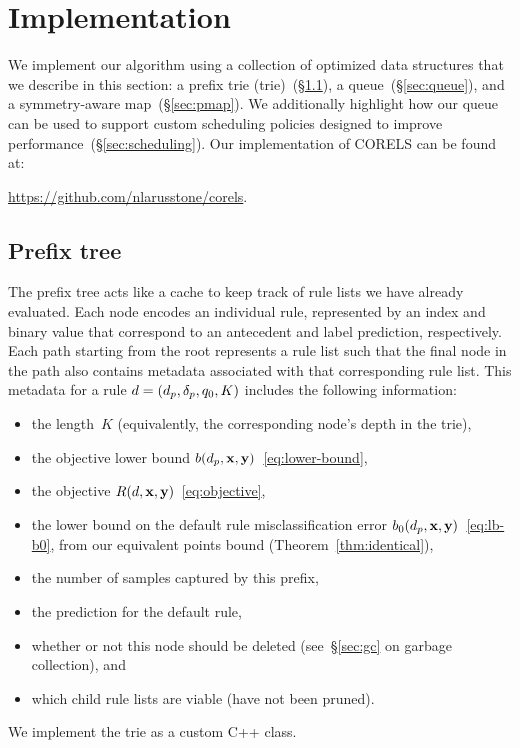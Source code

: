 

\section{Implementation}
\label{sec:implementation}

We implement our algorithm using a collection of optimized data structures
that we describe in this section:
a prefix trie (trie)~(\S\ref{sec:trie}), a queue~(\S\ref{sec:queue}),
and a symmetry-aware map~(\S\ref{sec:pmap}).
%
We additionally highlight how our queue can be used to support
custom scheduling policies designed to improve performance~(\S\ref{sec:scheduling}).
%
Our implementation of CORELS can be found at: \\

\centerline{\url{https://github.com/nlarusstone/corels}.}

\subsection{Prefix tree}
\label{sec:trie}

The prefix tree acts like a cache to keep track of rule lists we have already evaluated.
%
Each node encodes an individual rule, represented by an index and binary value
that correspond to an antecedent and label prediction, respectively.
%
Each path starting from the root represents a rule list such that the final node
in the path also contains metadata associated with that corresponding rule list.
%
This metadata for a rule ${{d} = (d_p, \delta_p, q_0, K)}$
includes the following information:
\begin{itemize}
\item the length~$K$ (equivalently, the corresponding node's depth in the trie),
\item the objective lower bound $b(d_p, \mathbf{x}, \mathbf{y})$~\eqref{eq:lower-bound},
\item the objective $R({d}, \mathbf{x}, \mathbf{y})$~\eqref{eq:objective},
\item the lower bound on the default rule misclassification error
$b_0(d_p, \mathbf{x}, \mathbf{y})$~\eqref{eq:lb-b0},
from our equivalent points bound (Theorem~\ref{thm:identical}),
\item the number of samples captured by this prefix,
\item the prediction for the default rule,
\item whether or not this node should be deleted (see~\S\ref{sec:gc} on garbage collection), and
\item which child rule lists are viable (\ie have not been pruned).
\end{itemize}
We implement the trie as a custom C++ class. %
%

